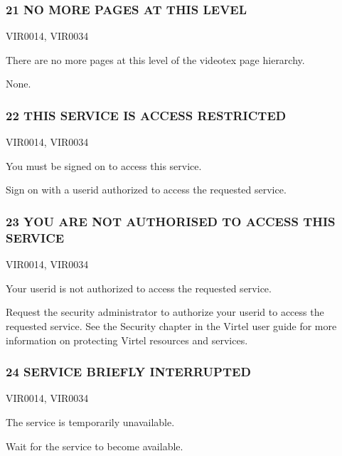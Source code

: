 \documentclass[letterpaper,10pt,english]{sphinxmanual}
\begin{document}
\subsubsection{21 NO MORE PAGES AT THIS LEVEL}
\label{\detokenize{messages:no-more-pages-at-this-level}}\begin{description}
\sphinxAtStartPar
VIR0014, VIR0034

\sphinxAtStartPar
There are no more pages at this level of the videotex page hierarchy.

\sphinxAtStartPar
None.

\end{description}


\subsubsection{22 THIS SERVICE IS ACCESS RESTRICTED}
\label{\detokenize{messages:this-service-is-access-restricted}}\begin{description}
\sphinxAtStartPar
VIR0014, VIR0034

\sphinxAtStartPar
You must be signed on to access this service.

\sphinxAtStartPar
Sign on with a userid authorized to access the requested service.

\end{description}


\subsubsection{23 YOU ARE NOT AUTHORISED TO ACCESS THIS SERVICE}
\label{\detokenize{messages:you-are-not-authorised-to-access-this-service}}\begin{description}
\sphinxAtStartPar
VIR0014, VIR0034

\sphinxAtStartPar
Your userid is not authorized to access the requested service.

\sphinxAtStartPar
Request the security administrator to authorize your userid to access the requested service. See the Security chapter in the Virtel user guide for more information on protecting Virtel resources and services.

\end{description}


\subsubsection{24 SERVICE BRIEFLY INTERRUPTED}
\label{\detokenize{messages:service-briefly-interrupted}}\begin{description}
\sphinxAtStartPar
VIR0014, VIR0034

\sphinxAtStartPar
The service is temporarily unavailable.

\sphinxAtStartPar
Wait for the service to become available.

\end{description}
\end{document}
